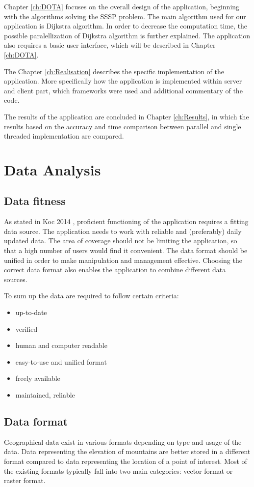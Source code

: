 \documentclass[thesis=M,english]{FITthesis}[2012/10/20]
\begin{document}
Chapter \ref{ch:DOTA} focuses on the overall design of the application, beginning with the algorithms solving the SSSP problem. The main algorithm used for our application is Dijkstra algorithm. In order to decrease the computation time, the possible paralellization of Dijkstra algorithm is further explained. The application also requires a basic user interface, which will be described in Chapter \ref{ch:DOTA}.

The Chapter \ref{ch:Realisation} describes the specific implementation of the application. More specifically how the application is implemented within server and client part, which frameworks were used and additional commentary of the code. 

The results of the application are concluded in Chapter \ref{ch:Results}, in which the results based on the accuracy and time comparison between parallel and single threaded implementation are compared.


\chapter{Data Analysis}
\label{ch:DA}

\section{Data fitness}
\label{S1: Good data}
As stated in Koc 2014 \cite{Koc14}, proficient functioning of the application requires a fitting data source. The application needs to work with reliable and (preferably) daily updated data. The area of coverage should not be limiting the application, so that a high number of users would find it convenient. The data format should be unified in order to make manipulation and management effective. Choosing the correct data format also enables the application to combine different data sources.

To sum up the data are required to follow certain criteria:
\begin{itemize}
	\item up-to-date
	\item verified
	\item human and computer readable
	\item easy-to-use and unified format
	\item freely available
	\item maintained, reliable
\end{itemize}


\section{Data format}
Geographical data exist in various formats depending on type and usage of the data. Data representing the elevation of mountains are better stored in a different format compared to data representing the location of a point of interest. 
Most of the existing formats typically fall into two main categories: vector format or raster format. 
\end{document}
